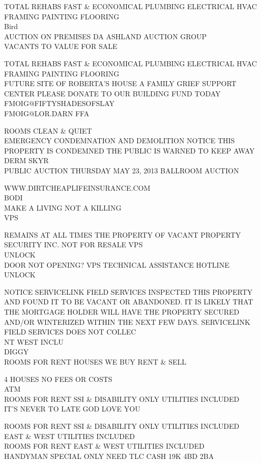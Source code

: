 \documentclass[10pt,letterpaper]{article}
\begin{document}
TOTAL REHABS FAST \& ECONOMICAL PLUMBING ELECTRICAL HVAC FRAMING PAINTING FLOORING\\
Bird\\
AUCTION ON PREMISES DA ASHLAND AUCTION GROUP\\
VACANTS TO VALUE FOR SALE

TOTAL REHABS FAST \& ECONOMICAL PLUMBING ELECTRICAL HVAC FRAMING PAINTING FLOORING\\
FUTURE SITE OF ROBERTA'S HOUSE A FAMILY GRIEF SUPPORT CENTER PLEASE DONATE TO OUR BUILDING FUND TODAY\\
FMOIG@FIFTYSHADESOFSLAY\\
FMOIG@LOR.DARN FFA

ROOMS CLEAN \& QUIET\\
EMERGENCY CONDEMNATION AND DEMOLITION NOTICE THIS PROPERTY IS CONDEMNED THE PUBLIC IS WARNED TO KEEP AWAY\\
DERM SKYR\\
PUBLIC AUCTION THURSDAY MAY 23, 2013 BALLROOM AUCTION

WWW.DIRTCHEAPLIFEINSURANCE.COM\\
BODI\\
MAKE A LIVING NOT A KILLING\\
VPS

REMAINS AT ALL TIMES THE PROPERTY OF VACANT PROPERTY SECURITY INC. NOT FOR RESALE VPS\\
UNLOCK\\
DOOR NOT OPENING?  VPS TECHNICAL ASSISTANCE HOTLINE\\
UNLOCK

NOTICE SERVICELINK FIELD SERVICES INSPECTED THIS PROPERTY AND FOUND IT TO BE VACANT OR ABANDONED.  IT IS LIKELY THAT THE MORTGAGE HOLDER WILL HAVE THE PROPERTY SECURED AND/OR WINTERIZED WITHIN THE NEXT FEW DAYS.  SERVICELINK FIELD SERVICES DOES NOT COLLEC\\
NT WEST INCLU\\
DIGGY\\
ROOMS FOR RENT HOUSES WE BUY RENT \& SELL

4 HOUSES NO FEES OR COSTS\\
ATM\\
ROOMS FOR RENT SSI \& DISABILITY ONLY UTILITIES INCLUDED\\
IT'S NEVER TO LATE GOD LOVE YOU

ROOMS FOR RENT SSI \& DISABILITY ONLY UTILITIES INCLUDED\\
EAST \& WEST UTILITIES INCLUDED\\
ROOMS FOR RENT EAST \& WEST UTILITIES INCLUDED\\
HANDYMAN SPECIAL ONLY NEED TLC CASH 19K 4BD 2BA
\end{document}
